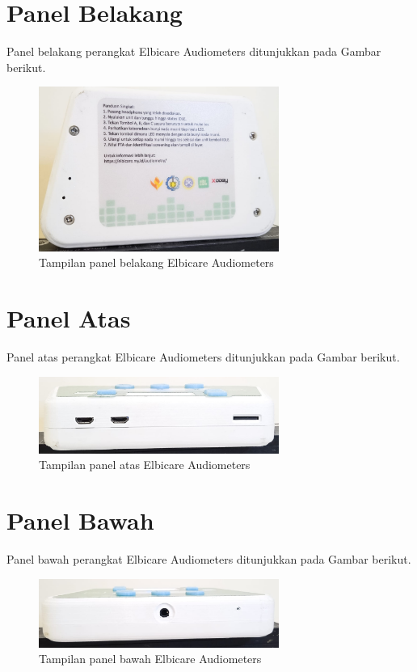 \documentclass[11pt,a4paper,twoside,onecolumn]{book}
\begin{document}
		\section{Panel Belakang}
		Panel belakang perangkat Elbicare Audiometers ditunjukkan pada Gambar berikut.
		\begin{figure}[H]
			\centering
			\includegraphics[width=0.7\textwidth]{images/belakang}
			\caption{Tampilan panel belakang Elbicare Audiometers}
		\end{figure}
		
		\section{Panel Atas}
		Panel atas perangkat Elbicare Audiometers ditunjukkan pada Gambar berikut.
		\begin{figure}[H]
			\centering
			\includegraphics[width=0.7\textwidth]{images/atas}
			\caption{Tampilan panel atas Elbicare Audiometers}
		\end{figure}
		
		\section{Panel Bawah}
		Panel bawah perangkat Elbicare Audiometers ditunjukkan pada Gambar berikut.		
		\begin{figure}[H]
			\centering
			\includegraphics[width=0.7\textwidth]{images/bawah}
			\caption{Tampilan panel bawah Elbicare Audiometers}
		\end{figure}
		
\end{document}
